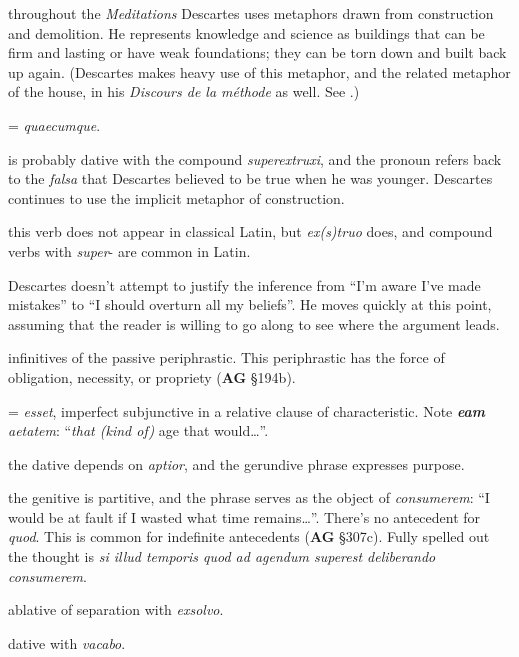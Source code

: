  throughout the \textit{Meditations} Descartes uses metaphors drawn from construction and demolition. He represents knowledge and science as buildings that can be firm and lasting or have weak foundations; they can be torn down and built back up again. (Descartes makes heavy use of this metaphor, and the related metaphor of the house, in his \textit{Discours de la méthode} as well. See \cite[22]{curtis1984}.)

 = \textit{quaecumque}.

 is probably dative with the compound \textit{superextruxi}, and the pronoun refers back to the \textit{falsa} that Descartes believed to be true when he was younger. Descartes continues to use the implicit metaphor of construction.

 this verb does not appear in classical Latin, but \textit{ex(s)truo} does, and compound verbs with \textit{super}- are common in Latin.

 Descartes doesn't attempt to justify the inference from ``I'm aware I've made mistakes'' to ``I should overturn all my beliefs''. He moves quickly at this point, assuming that the reader is willing to go along to see where the argument leads. 

 infinitives of the passive periphrastic. This periphrastic has the force of obligation, necessity, or propriety (\textbf{AG} §194b).

 = \textit{esset}, imperfect subjunctive in a relative clause of characteristic. Note \textit{\textbf{eam} aetatem}: ``\textit{that (kind of)} age that would\dots''.

 the dative depends on \textit{aptior}, and the gerundive phrase expresses purpose.

 the genitive is partitive, and the phrase serves as the object of \textit{consumerem}: ``I would be at fault if I wasted what time remains\dots''. There's no antecedent for \textit{quod}. This is common for indefinite antecedents (\textbf{AG} §307c). Fully spelled out the thought is \textit{si illud temporis quod ad agendum superest deliberando consumerem}.

 ablative of separation with \textit{exsolvo}.

 dative with \textit{vacabo}.

